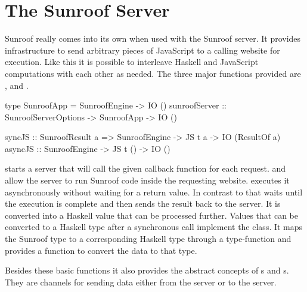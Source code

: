  
\section{The Sunroof Server}
\label{sec:server}

Sunroof really comes into its own when used with the Sunroof server.
It provides infrastructure to send arbitrary pieces 
of JavaScript to a calling website for execution. 
Like this it is possible to interleave Haskell and JavaScript 
computations with each other as needed. The three major functions
provided are ,  and .
\begin{Code}
type SunroofApp = SunroofEngine -> IO ()
sunroofServer :: SunroofServerOptions -> SunroofApp -> IO ()

syncJS  :: SunroofResult a 
        => SunroofEngine -> JS t a -> IO (ResultOf a)
asyncJS :: SunroofEngine -> JS t () -> IO ()
\end{Code}
 starts a server that will call the given callback function
for each request.
 and  allow the server
to run Sunroof code inside the requesting website.
 executes it asynchronously without 
waiting for a return value. In contrast to that 
 waits until the execution is complete and
then sends the result back to the server. It
is converted into a Haskell value that can be processed further. 
Values that can be converted to a Haskell type after a synchronous
call implement the  class. It maps the 
Sunroof type to a corresponding Haskell type through a type-function 
and provides a function to convert the data to that type.

Besides these basic functions it also provides the abstract 
concepts of s and s. They are 
channels for sending data either from the server or to
the server.


